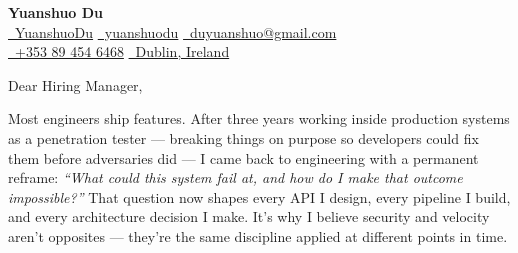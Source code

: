 \documentclass{coverletter}
\begin{document}
\begin{center}
  {\Large\sffamily\bfseries\color{namecolor} Yuanshuo Du}\\[0.12cm]
  {\sffamily\small
    \href{https://github.com/YuanshuoDu}{\color{accent}\faGithub\color{muted}\ YuanshuoDu}
    \quad\textbullet\quad
    \href{https://linkedin.com/in/yuanshuodu}{\color{accent}\faLinkedin\color{muted}\ yuanshuodu}
    \quad\textbullet\quad
    \href{https://mail.google.com/mail/?view=cm&to=duyuanshuo@gmail.com}{\color{accent}\faEnvelope\color{muted}\ duyuanshuo@gmail.com}
  }\\[0.06cm]
  {\sffamily\small\color{muted}
    \href{tel:+353894546468}{\color{accent}\faPhone\color{muted}\ +353 89 454 6468}
    \quad\textbullet\quad
    \href{https://www.google.com/maps/place/Dublin,+Ireland}{\color{accent}\faMapMarker\color{muted}\ Dublin, Ireland}
  }
\end{center}

\clrule

\noindent%
{\color{secondary}\sffamily\small
  Dear Hiring Manager,
}

\vspace{0.25cm}

\noindent%
{\color{secondary}\sffamily\small
  Most engineers ship features. After three years working inside production systems
  as a penetration tester — breaking things on purpose so developers could fix them
  before adversaries did — I came back to engineering with a permanent reframe:
  \textit{``What could this system fail at, and how do I make that outcome impossible?''}
  That question now shapes every API I design, every pipeline I build, and every
  architecture decision I make. It's why I believe security and velocity aren't
  opposites — they're the same discipline applied at different points in time.
}

\vspace{0.3cm}
\end{document}
